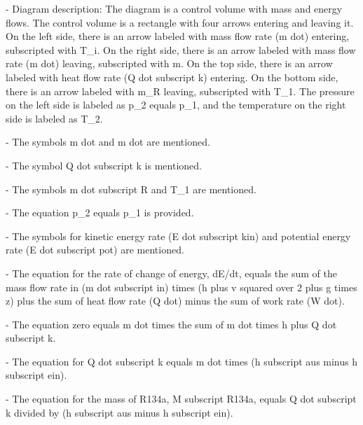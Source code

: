 - Diagram description: The diagram is a control volume with mass and energy flows. The control volume is a rectangle with four arrows entering and leaving it. On the left side, there is an arrow labeled with mass flow rate (m dot) entering, subscripted with T_i. On the right side, there is an arrow labeled with mass flow rate (m dot) leaving, subscripted with m. On the top side, there is an arrow labeled with heat flow rate (Q dot subscript k) entering. On the bottom side, there is an arrow labeled with m_R leaving, subscripted with T_1. The pressure on the left side is labeled as p_2 equals p_1, and the temperature on the right side is labeled as T_2.

- The symbols m dot and m dot are mentioned.

- The symbol Q dot subscript k is mentioned.

- The symbols m dot subscript R and T_1 are mentioned.

- The equation p_2 equals p_1 is provided.

- The symbols for kinetic energy rate (E dot subscript kin) and potential energy rate (E dot subscript pot) are mentioned.

- The equation for the rate of change of energy, dE/dt, equals the sum of the mass flow rate in (m dot subscript in) times (h plus v squared over 2 plus g times z) plus the sum of heat flow rate (Q dot) minus the sum of work rate (W dot).

- The equation zero equals m dot times the sum of m dot times h plus Q dot subscript k.

- The equation for Q dot subscript k equals m dot times (h subscript aus minus h subscript ein).

- The equation for the mass of R134a, M subscript R134a, equals Q dot subscript k divided by (h subscript aus minus h subscript ein).